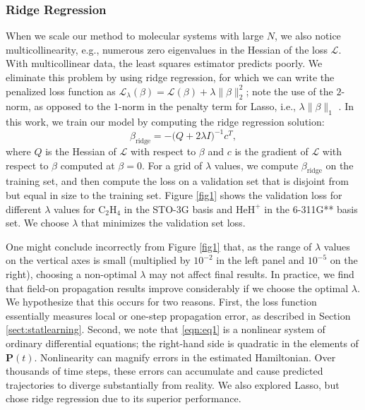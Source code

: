 \documentclass[10pt]{article}
\newcommand{\heh}{\ensuremath{\text{HeH}^+} }
\newcommand{\ethylene}{\ensuremath{\text{C}_2\text{H}_4} }
\begin{document}
\subsubsection{Ridge Regression}
When we scale our method to molecular systems with large $N$, we also notice multicollinearity, e.g., numerous zero eigenvalues in the Hessian of the loss $\mathcal{L}$. With multicollinear data, the least squares estimator predicts poorly. We eliminate this problem by using ridge regression, for which we can write the penalized loss function as $\mathcal{L}_{\lambda}( \beta ) =  \mathcal{L}( \beta )  + \lambda \|\beta\|_2^2$; note the use of the $2$-norm, as opposed to the $1$-norm in the penalty term for Lasso, i.e., $\lambda \|\beta\|_1$ \cite{hastie01statisticallearning}. In this work, we train our model by computing the ridge regression solution:  %
\begin{equation}
    \beta_{\text{ridge}} = -\big(Q +2 \lambda I\big)^{-1}c^T,
\end{equation}
where $Q$ is the Hessian of $\mathcal{L}$ with respect to $\beta$ and $c$ is the gradient of $\mathcal{L}$ with respect to $\beta$ computed at $\beta=0$. For a grid of $\lambda$ values, we compute $\beta_{\text{ridge}}$ on the training set, and then compute the loss on a validation set that is disjoint from but equal in size to the training set. Figure \ref{fig1} shows the validation loss for different $\lambda$ values for \ethylene in the STO-3G basis and \heh in the 6-311G** basis set. We choose $\lambda$ that minimizes the validation set loss.

One might conclude incorrectly from Figure \ref{fig1} that, as the range of $\lambda$ values on the vertical axes is small (multiplied by $10^{-2}$ in the left panel and $10^{-5}$ on the right), choosing a non-optimal $\lambda$ may not affect final results. In practice, we find that field-on propagation results improve considerably if we choose the optimal $\lambda$. We hypothesize that this occurs for two reasons.  First, the loss function essentially measures local or one-step propagation error, as described in Section \ref{sect:statlearning}. Second, we note that \eqref{eqn:eq1} is a nonlinear system of ordinary differential equations; the right-hand side is quadratic in the elements of $\mathbf{P}(t)$.  Nonlinearity can magnify errors in the estimated Hamiltonian.  Over thousands of time steps, these errors can accumulate and cause predicted trajectories to diverge substantially from reality.  We also explored Lasso, but chose ridge regression due to its superior performance.
\end{document}
